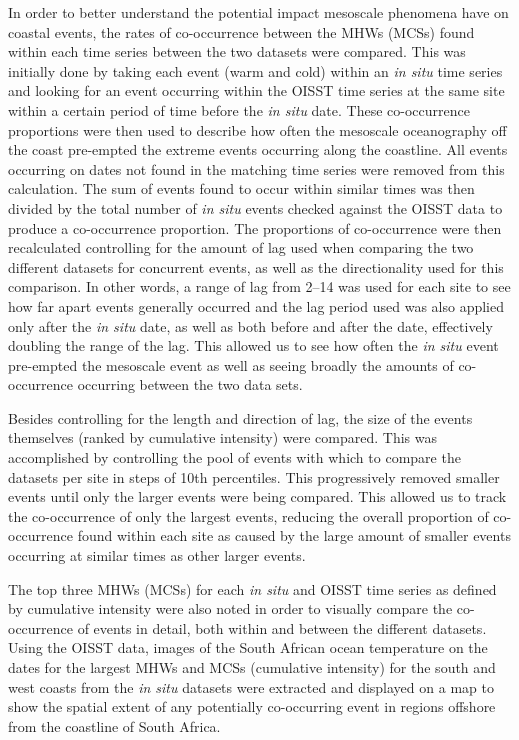 \documentclass[a4paper,10pt,review]{elsarticle}
\begin{document}
In order to better understand the potential impact mesoscale phenomena have on coastal events, the rates of co-occurrence between the MHWs (MCSs) found within each time series between the two datasets were compared. This was initially done by taking each event (warm and cold) within an \emph{in situ} time series and looking for an event occurring within the OISST time series at the same site within a certain period of time before the \emph{in situ} date. These co-occurrence proportions were then used to describe how often the mesoscale oceanography off the coast pre-empted the extreme events occurring along the coastline. All events occurring on dates not found in the matching time series were removed from this calculation. The sum of events found to occur within similar times was then divided by the total number of \emph{in situ} events checked against the OISST data to produce a co-occurrence proportion. The proportions of co-occurrence were then recalculated controlling for the amount of lag used when comparing the two different datasets for concurrent events, as well as the directionality used for this comparison. In other words, a range of lag from 2--14 was used for each site to see how far apart events generally occurred and the lag period used was also applied only after the \emph{in situ} date, as well as both before and after the date, effectively doubling the range of the lag. This allowed us to see how often the \emph{in situ} event pre-empted the mesoscale event as well as seeing broadly the amounts of co-occurrence occurring between the two data sets.

Besides controlling for the length and direction of lag, the size of the events themselves (ranked by cumulative intensity) were compared. This was accomplished by controlling the pool of events with which to compare the datasets per site in steps of 10th percentiles. This progressively removed smaller events until only the larger events were being compared. This allowed us to track the co-occurrence of only the largest events, reducing the overall proportion of co-occurrence found within each site as caused by the large amount of smaller events occurring at similar times as other larger events.

The top three MHWs (MCSs) for each \emph{in situ} and OISST time series as defined by cumulative intensity were also noted in order to visually compare the co-occurrence of events in detail, both within and between the different datasets. Using the OISST data, images of the South African ocean temperature on the dates for the largest MHWs and MCSs (cumulative intensity) for the south and west coasts from the \emph{in situ} datasets were extracted and displayed on a map to show the spatial extent of any potentially co-occurring event in regions offshore from the coastline of South Africa. 
\end{document}

